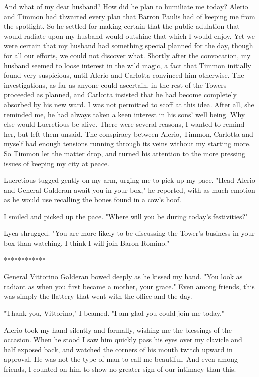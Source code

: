 \documentclass{article}
\begin{document}
And what of my dear husband? How did he plan to humiliate me today? Alerio and Timmon had thwarted every plan that Barron Paulis had of keeping me from the spotlight. So he settled for making certain that the public adulation that would radiate upon my husband would outshine that which I would enjoy. Yet we were certain that my husband had something special planned for the day, though for all our efforts, we could not discover what. Shortly after the convocation, my husband seemed to loose interest in the wild magic, a fact that Timmon initially found very suspicious, until Alerio and Carlotta convinced him otherwise. The investigations, as far as anyone could ascertain, in the rest of the Towers proceeded as planned, and Carlotta insisted that he had become completely absorbed by his new ward. I was not permitted to scoff at this idea. After all, she reminded me, he had always taken a keen interest in his sons' well being. Why else would Lucretious be alive. There were several reasons, I wanted to remind her, but left them unsaid. The conspiracy between Alerio, Timmon, Carlotta and myself had enough tensions running through its veins without my starting more. So Timmon let the matter drop, and turned his attention to the more pressing issues of keeping my city at peace.

Lucretious tugged gently on my arm, urging me to pick up my pace. "Head Alerio and General Galderan await you in your box," he reported, with as much emotion as he would use recalling the bones found in a cow's hoof.

I smiled and picked up the pace. "Where will you be during today's festivities?"

Lyca shrugged. "You are more likely to be discussing the Tower's business in your box than watching. I think I will join Baron Romino."

************

General Vittorino Galderan bowed deeply as he kissed my hand. "You look as radiant as when you first became a mother, your grace." Even among friends, this was simply the flattery that went with the office and the day.

"Thank you, Vittorino," I beamed. "I am glad you could join me today."

Alerio took my hand silently and formally, wishing me the blessings of the occasion. When he stood I saw him quickly pass his eyes over my clavicle and half exposed back, and watched the corners of his mouth twitch upward in approval. He was not the type of man to call me beautiful. And even among friends, I counted on him to show no greater sign of our intimacy than this.
\end{document}

